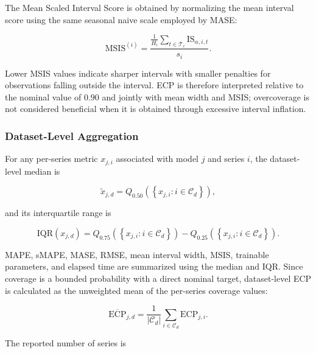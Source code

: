 \documentclass[review,number,sort&compress]{elsarticle}
\begin{document}
The Mean Scaled Interval Score is obtained by normalizing the mean interval score using the same seasonal naive scale employed by MASE:

\begin{equation}
\mathrm{MSIS}^{(i)}
=
\frac{
    \displaystyle
    \frac{1}{H_i}
    \sum_{t\in\mathcal{T}_i}
    \mathrm{IS}_{\alpha,i,t}
}{
    s_i
}.
\label{eq:msis}
\end{equation}

Lower MSIS values indicate sharper intervals with smaller penalties for observations falling outside the interval. ECP is therefore interpreted relative to the nominal value of $0.90$ and jointly with mean width and MSIS; overcoverage is not considered beneficial when it is obtained through excessive interval inflation.

\subsubsection{Dataset-Level Aggregation}

For any per-series metric $x_{j,i}$ associated with model $j$ and series $i$, the dataset-level median is

\begin{equation}
\widetilde{x}_{j,d}
=
Q_{0.50}
\left(
    \left\{
        x_{j,i}:i\in\mathcal{C}_d
    \right\}
\right),
\label{eq:metric_median}
\end{equation}

and its interquartile range is

\begin{equation}
\mathrm{IQR}(x_{j,d})
=
Q_{0.75}
\left(
    \left\{
        x_{j,i}:i\in\mathcal{C}_d
    \right\}
\right)
-
Q_{0.25}
\left(
    \left\{
        x_{j,i}:i\in\mathcal{C}_d
    \right\}
\right).
\label{eq:metric_iqr}
\end{equation}

MAPE, sMAPE, MASE, RMSE, mean interval width, MSIS, trainable parameters, and elapsed time are summarized using the median and IQR. Since coverage is a bounded probability with a direct nominal target, dataset-level ECP is calculated as the unweighted mean of the per-series coverage values:

\begin{equation}
\overline{\mathrm{ECP}}_{j,d}
=
\frac{1}{|\mathcal{C}_d|}
\sum_{i\in\mathcal{C}_d}
\mathrm{ECP}_{j,i}.
\label{eq:mean_ecp}
\end{equation}

The reported number of series is
\end{document}
